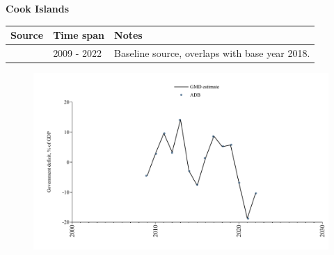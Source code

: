 \documentclass[12pt,a4paper,landscape]{article}
\begin{document}
\begin{adjustbox}{max totalsize={\paperwidth}{\paperheight},center}
\begin{minipage}[t][\textheight][t]{\textwidth}
\vspace*{0.5cm}
{}
\begin{center}
{\Large\bfseries Cook Islands}
\end{center}
\vspace{0.5cm}
\begin{table}[H]
\centering
\small
\begin{tabular}{|l|l|l|}
\hline
\textbf{Source} & \textbf{Time span} & \textbf{Notes} \\
\hline
\rowcolor{white}\cite{ADB}& 2009 - 2022 &Baseline source, overlaps with base year 2018.\\
\hline
\end{tabular}
\end{table}
\begin{figure}[H]
\centering
\includegraphics[width=\textwidth,height=0.6\textheight,keepaspectratio]{graphs/COK_govdef_GDP.pdf}
\end{figure}
\end{minipage}
\end{adjustbox}
\end{document}
